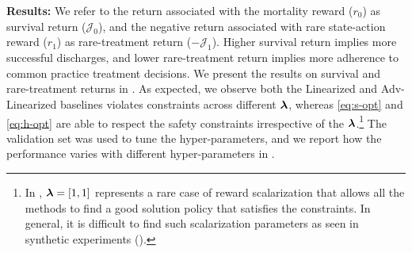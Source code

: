 \textbf{Results:}
We refer to the return associated with the mortality reward ($r_0$) as survival return ($\mathcal{J}_{0}$), and the negative return associated with rare state-action reward ($r_1$) as rare-treatment return ($- \mathcal{J}_{1}$). Higher survival return implies more successful discharges, and lower rare-treatment return implies more adherence to common practice treatment decisions.
We present the results on survival and rare-treatment returns 
in . 
As expected, we observe both the Linearized and Adv-Linearized baselines violates constraints across different $\bm{\lambda}$, whereas \ref{eq:s-opt} and \ref{eq:h-opt} are able to respect the safety constraints irrespective of the $\bm{\lambda}$.\footnote{In , $\bm{\lambda} =[1,1]$ represents a rare case of reward scalarization that allows all the methods to find a good solution policy that satisfies the constraints.  In general, it is difficult to find such scalarization parameters as seen in synthetic experiments ().}
The validation set was used to tune the hyper-parameters, and we report how the performance varies with different hyper-parameters in . 




